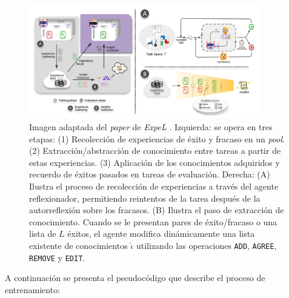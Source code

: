 \begin{figure}[H]
\centering
\includegraphics[width=0.9\textwidth]{Graphics/training.png}
\caption{Imagen adaptada del \textit{paper} de \textit{ExpeL} \parencite{zhao2024expel}. Izquierda: se opera en tres etapas: (1) Recolección de experiencias de éxito y fracaso en un \textit{pool}. (2) Extracción/abstracción de conocimiento entre tareas a partir de estas experiencias. (3) Aplicación de los conocimientos adquiridos y recuerdo de éxitos pasados en tareas de evaluación. Derecha: (A) Ilustra el proceso de recolección de experiencias a través del agente reflexionador, permitiendo reintentos de la tarea después de la autorreflexión sobre los fracasos. (B) Ilustra el paso de extracción de conocimiento. Cuando se le presentan pares de éxito/fracaso o una lista de $L$ éxitos, el agente modifica dinámicamente una lista existente de conocimientos $\hat{\iota}$ utilizando las operaciones \texttt{ADD}, \texttt{AGREE}, \texttt{REMOVE} y \texttt{EDIT}.}
\label{fig:training}
\end{figure}

A continuación se presenta el pseudocódigo que describe el proceso de entrenamiento:


